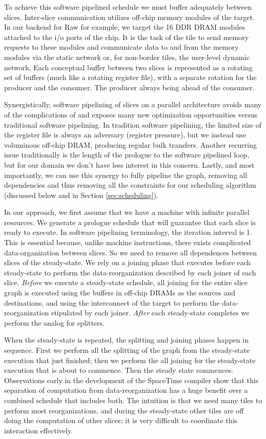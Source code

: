 To achieve this software pipelined schedule we must buffer adequately
between slices.  Inter-slice communication utilizes off-chip memory
modules of the target.  In our backend for Raw for example, we target
the 16 DDR DRAM modules attached to the i/o ports of the chip.  It is
the task of the tile to send memory requests to these modules and
communicate data to and from the memory modules via the static network
or, for non-border tiles, the user-level dynamic network.  Each
conceptual buffer between two slices is represented as a rotating set
of buffers (much like a rotating register file), with a separate
rotation for the producer and the consumer.  The producer
always being ahead of the consumer.

Synergistically, software pipelining of slices on a parallel architecture
avoids many of the complications of and exposes many new optimization
opportunities versus traditional software pipelining.  In tradition
software pipelining, the limited size of the register file is always
an adversary (register pressure), but we instead use voluminous
off-chip DRAM, producing regular bulk transfers.  Another recurring
issue traditionally is the length of the prologue to the software
pipelined loop, but for our domain we don't have less interest in this
concern.  Lastly, and most importantly, we can use this synergy to
fully pipeline the graph, removing all dependencies and thus removing
all the constraints for our scheduling algorithm (discussed below and
in Section \ref{sec:scheduling}).

In our approach, we first assume that we have a machine with infinite
parallel resources.  We generate a prologue schedule that will
guarantee that each slice is ready to execute.  In software pipelining
terminology, the iteration interval is 1.  This is essential because,
unlike machine instructions, there exists complicated
data-organization between slices.  So we need to remove all
dependences between slices of the steady-state.  We rely on a joining
phase that executes before each steady-state to perform the
data-reorganization described by each joiner of each slice.  {\it
Before} we execute a steady-state schedule, all joining for the entire
slice graph is executed using the buffers in off-chip DRAMs as the
sources and destinations, and using the interconnect of the target to
perform the data-reorganization stipulated by each joiner.  {\it
After} each steady-state completes we perform the analog for
splitters.  

When the steady-state is repeated, the splitting and joining phases
happen in sequence.  First we perform all the splitting of the graph
from the steady-state execution that just finished; then we perform
the all joining for the steady-state execution that is about to
commence.  Then the steady state commences.  Observations early in the
development of the SpaceTime compiler show that this separation of
computation from data-reorganization has a huge benefit over a
combined schedule that includes both.  The intuition is that we need
many tiles to perform most reorganizations, and during the
steady-state other tiles are off doing the computation of other
slices; it is very difficult to coordinate this interaction
effectively.


